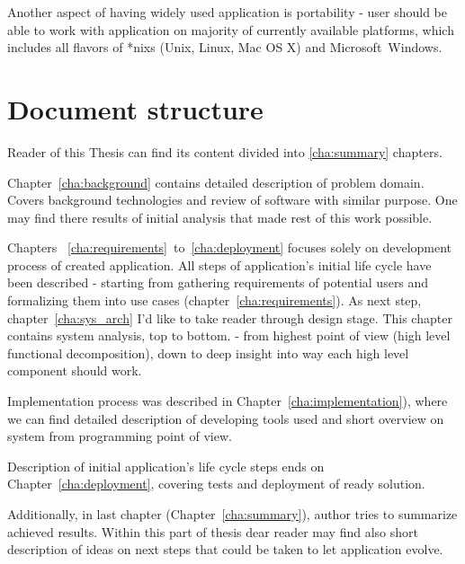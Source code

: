 Another aspect of having widely used application is portability - user should be able to work with application on
majority of currently available platforms, which includes all flavors of *nixs (Unix, Linux, Mac OS X\textregistered)
and Microsoft\textregistered~Windows\textregistered. 


\section{Document structure}
\label{ch1:docStructure}

Reader of this Thesis can find its content divided into \ref{cha:summary} chapters. 

Chapter~\ref{cha:background} contains detailed description of problem domain. Covers background technologies and review
of software
with similar purpose. One may find there results of initial analysis that made rest of this work possible.

Chapters ~\ref{cha:requirements}~to~\ref{cha:deployment} focuses solely on development process of created application.
All steps of application's initial life cycle have been described - starting from gathering requirements of potential
users and formalizing them into use cases (chapter~\ref{cha:requirements}). As next step, chapter~\ref{cha:sys_arch}
I'd like to take reader through design stage. This chapter contains system analysis, top to bottom. - from
highest point of view (high level functional decomposition), down to deep insight into way each high level component
should work. 

Implementation process was described in Chapter~\ref{cha:implementation}), where we can find detailed description of
developing tools used and short overview on system from programming point of view.

Description of initial application's life cycle steps ends on Chapter~\ref{cha:deployment}, covering tests and
deployment of ready solution.

Additionally, in last chapter (Chapter~\ref{cha:summary}), author tries to summarize achieved results. Within this
part of thesis dear reader may find also short description of ideas on next steps that could be taken to let application
evolve.




